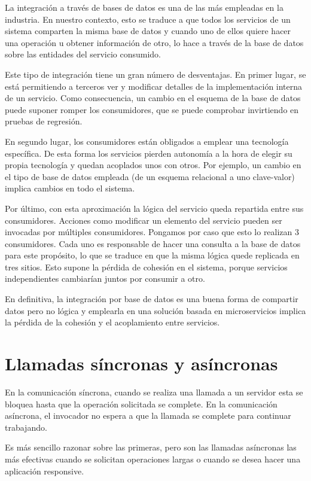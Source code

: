 \documentclass[11pt,a4paper]{article}
\begin{document}
La integración a través de bases de datos es una de las más empleadas en la industria. En nuestro contexto, esto se traduce a que todos los servicios de un sistema comparten la misma base de datos y cuando uno de ellos quiere hacer una operación u obtener información de otro, lo hace a través de la base de datos sobre las entidades del servicio consumido. 

Este tipo de integración tiene un gran número de desventajas. En primer lugar, se está permitiendo a terceros ver y modificar detalles de la implementación interna de un servicio. Como consecuencia, un cambio en el esquema de la base de datos puede suponer romper los consumidores, que se puede comprobar invirtiendo en pruebas de regresión.

En segundo lugar, los consumidores están obligados a emplear una tecnología específica. De esta forma los servicios pierden autonomía a la hora de elegir su propia tecnología y quedan acoplados unos con otros. Por ejemplo, un cambio en el tipo de base de datos empleada (de un esquema relacional a uno clave-valor) implica cambios en todo el sistema.

Por último, con esta aproximación la lógica del servicio queda repartida entre sus consumidores. Acciones como modificar un elemento del servicio pueden ser invocadas por múltiples consumidores. Pongamos por caso que esto lo realizan 3 consumidores. Cada uno es responsable de hacer una consulta a la base de datos para este propósito, lo que se traduce en que la misma lógica quede replicada en tres sitios. Esto supone la pérdida de cohesión en el sistema, porque servicios independientes cambiarían juntos por consumir a otro.

En definitiva, la integración por base de datos es una buena forma de compartir datos pero no lógica y emplearla en una solución basada en microservicios implica la pérdida de la cohesión y el acoplamiento entre servicios.

\section{Llamadas síncronas y asíncronas}

En la comunicación síncrona, cuando se realiza una llamada a un servidor esta se bloquea hasta que la operación solicitada se complete. En la comunicación asíncrona, el invocador no espera a que la llamada se complete para continuar trabajando.

Es más sencillo razonar sobre las primeras, pero son las llamadas asíncronas las más efectivas cuando se solicitan operaciones largas o cuando se desea hacer una aplicación responsive.
\end{document}
